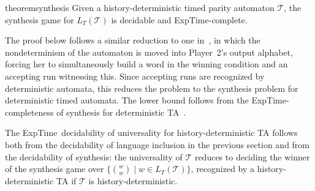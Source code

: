 \documentclass[10pt,a4paper]{amsart}
\theoremstyle{definition}
\numberwithin{equation}{section}
\newcommand{\T}{\mathcal{T}}
\newcommand{\exptime}{\EXPTIME}
\newcommand{\lang}{L_T}  %
\newcommand{\EXPTIME}{{\sc ExpTime}}
\begin{document}
\begin{restatable}{theorem}{synthesis}
    \label{thm:synthesis}
	Given a history-deterministic timed parity automaton $\T$, the synthesis game for $\lang(\T)$ is decidable and \exptime-complete.
\end{restatable}

The proof below follows a similar reduction to one in~\cite{LZ22}, in which the nondeterminism of the automaton is moved into Player~2's output alphabet, forcing her to simultaneously build a word in the winning condition and an accepting run witnessing this. Since accepting runs are recognized by deterministic automata, this reduces the problem to the synthesis problem for deterministic timed automata.	The lower bound follows from the \exptime-completeness of synthesis for deterministic TA~\cite{DM2002}.

The \exptime\ decidability of universality for history-deterministic TA follows both from the decidability of language inclusion in the previous section and from the decidability of synthesis: the universality of $\T$ reduces to deciding the winner of the synthesis game over $\{\binom{w}{w}\mid w\in \lang(\T)\}$, recognized by a history-deterministic TA if $\T$ is history-deterministic.
\end{document}
